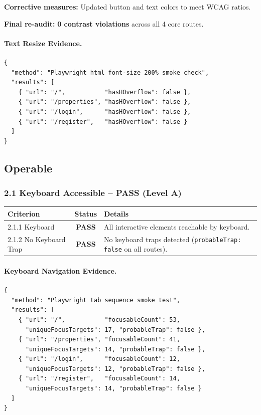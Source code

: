 \documentclass[12pt,a4paper]{article}
\newcommand{\pass}{\textcolor{passgreen}{\textbf{PASS}}}
\begin{document}
\noindent\textbf{Corrective measures:} Updated button and text colors to meet WCAG ratios.

\noindent\textbf{Final re-audit:} \textcolor{passgreen}{\textbf{0 contrast violations}} across all 4 core routes.

\paragraph{Text Resize Evidence.}

\begin{lstlisting}[caption={Text resize 200\% smoke check results}]
{
  "method": "Playwright html font-size 200% smoke check",
  "results": [
    { "url": "/",           "hasHOverflow": false },
    { "url": "/properties", "hasHOverflow": false },
    { "url": "/login",      "hasHOverflow": false },
    { "url": "/register",   "hasHOverflow": false }
  ]
}
\end{lstlisting}

\subsection{Operable}

\subsubsection{2.1 Keyboard Accessible -- \pass{} (Level A)}

\begin{table}[H]
\centering
\begin{tabularx}{\textwidth}{lcX}
\toprule
\textbf{Criterion} & \textbf{Status} & \textbf{Details} \\
\midrule
2.1.1 Keyboard         & \pass & All interactive elements reachable by keyboard. \\
2.1.2 No Keyboard Trap & \pass & No keyboard traps detected (\texttt{probableTrap: false} on all routes). \\
\bottomrule
\end{tabularx}
\end{table}

\paragraph{Keyboard Navigation Evidence.}

\begin{lstlisting}[caption={Keyboard navigation smoke test results}]
{
  "method": "Playwright tab sequence smoke test",
  "results": [
    { "url": "/",           "focusableCount": 53,
      "uniqueFocusTargets": 17, "probableTrap": false },
    { "url": "/properties", "focusableCount": 41,
      "uniqueFocusTargets": 14, "probableTrap": false },
    { "url": "/login",      "focusableCount": 12,
      "uniqueFocusTargets": 12, "probableTrap": false },
    { "url": "/register",   "focusableCount": 14,
      "uniqueFocusTargets": 14, "probableTrap": false }
  ]
}
\end{lstlisting}
\end{document}
